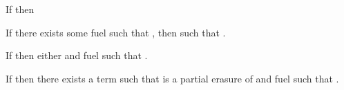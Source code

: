 \begin{lemma}
  If \ltitjudgement{\ltiEnv{}}
                   {\ltiE{}}
                   {\ltiT{}}
                   {\ltiEp{}}
                  then
  \ltitSdjudgement{\ltiEnv{}}
                     {\ltiE{}}
                     {\ltiT{}}
                     {\ltiEp{}}
\end{lemma}

\begin{lemma}
  If there exists some fuel \ltiFuel{} such that
    \ltitSstkjudgement{\ltimakeCombinedThreadedEnv{\ltiFuel{}}{\ltiEmptyClosureCache}}
                      {\ltiEnv{}}
                      {}
                      {\ltiT{}}
                      {\ltimakeCombinedThreadedEnv{\ltiFuelp{}}{\ltiClosureCache{}}}
                      {},
                      then
    \ltitSdjudgement{\ltielimClosEnvLHS{\ltiClosureCache{}}{\ltiEnv{}}}
                    {}
                    {\ltiS{}}
                    {\ltiEp{}}
                    such that
                      \ltiisubtype{\ltielimClosEnvLHS{\ltiClosureCache{}}{\ltiEnv{}}}{\ltiS{}}{\ltielimClosTLHS{\varnothing}{\ltiClosureCache{}}{\ltiT{}}}.
\end{lemma}

\begin{lemma}
  If \ltitSdjudgement{\ltiEnv{}}
                     {\ltiE{}}
                     {\ltiT{}}
                     {\ltiEp{}}
                     then
    either
    and fuel \ltiFuel{}
    such that
    \ltitSstkjudgement{\ltimakeCombinedThreadedEnv{\ltiFuel{}}{\ltiEmptyClosureCache}}
                      {\ltiEnv{}}
                      {\ltiF{}}
                      {\ltiT{}}
                      {\ltimakeCombinedThreadedEnv{\ltiFuelp{}}{\ltiClosureCache{}}}
                      {\ltiFp{}}.
\end{lemma}

\begin{lemma}
  If \ltitSdjudgement{\ltiEnv{}}
                     {\ltiE{}}
                     {\ltiT{}}
                     {\ltiEp{}}
                     then
    there exists a term \ltiF{} such that \ltiE{} is a partial erasure of \ltiF{}
    and fuel \ltiFuel{}
    such that
    \ltitSstkjudgement{\ltimakeCombinedThreadedEnv{\ltiFuel{}}{\ltiEmptyClosureCache}}
                      {\ltiEnv{}}
                      {\ltiF{}}
                      {\ltiT{}}
                      {\ltimakeCombinedThreadedEnv{\ltiFuelp{}}{\ltiClosureCache{}}}
                      {\ltiFp{}}.
\end{lemma}

